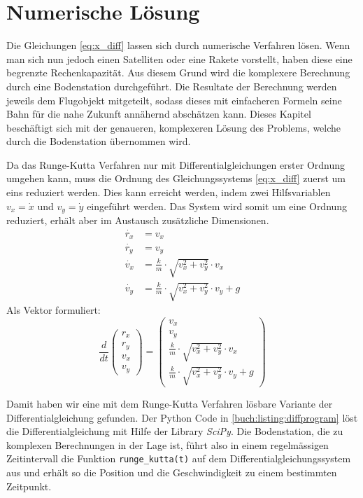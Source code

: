\section{Numerische Lösung
\label{perturbation:section:nummerischeloesung}}
Die Gleichungen \eqref{eq:x_diff} lassen sich durch numerische Verfahren lösen.
Wenn man sich nun jedoch einen Satelliten oder eine Rakete vorstellt, haben diese eine begrenzte Rechenkapazität.
Aus diesem Grund wird die komplexere Berechnung durch eine Bodenstation durchgeführt.
Die Resultate der Berechnung werden jeweils dem Flugobjekt mitgeteilt, sodass dieses mit einfacheren Formeln seine Bahn für die nahe Zukunft annähernd abschätzen kann.
Dieses Kapitel beschäftigt sich mit der genaueren, komplexeren Lösung des Problems, welche durch die Bodenstation übernommen wird.

Da das Runge-Kutta Verfahren nur mit Differentialgleichungen erster Ordnung umgehen kann, muss die Ordnung des Gleichungssystems \eqref{eq:x_diff}  zuerst um eins reduziert werden.
Dies kann erreicht werden, indem zwei Hilfsvariablen $v_x = \dot{x}$ und $v_y = \dot{y}$ eingeführt werden.
Das System wird somit um eine Ordnung reduziert, erhält aber im Austausch zusätzliche Dimensionen.
\begin{equation*}
\begin{aligned}
	\dot{r_x} &= v_x  \\
	\dot{r_y} &= v_y \\
	\dot{v_x} &= \frac{k}{m} \cdot \sqrt{v_x^2 + v_y^2} \cdot v_x \\
	\dot{v_y} &= \frac{k}{m} \cdot \sqrt{v_x^2 + v_y^2} \cdot v_y + g
\end{aligned}
\end{equation*}
Als Vektor formuliert:
\[
\frac{d}{dt}\begin{pmatrix}r_x\\r_y\\v_x\\v_y\end{pmatrix} = \begin{pmatrix}v_x\\v_y\\\frac{k}{m} \cdot \sqrt{v_x^2 + v_y^2} \cdot v_x\\\frac{k}{m} \cdot \sqrt{v_x^2 + v_y^2} \cdot v_y + g\end{pmatrix}
\]

Damit haben wir eine mit dem  Runge-Kutta Verfahren lösbare Variante der Differentialgleichung gefunden.
Der Python Code in \ref{buch:listing:diffprogram} löst die Differentialgleichung mit Hilfe der Library \textit{SciPy}.
Die Bodenstation, die zu komplexen Berechnungen in der Lage ist,
führt also in einem regelmässigen Zeitintervall die Funktion \lstinline[language=Python]{runge_kutta(t)}
auf dem Differentialgleichungssystem aus und erhält so die Position und die Geschwindigkeit zu einem bestimmten Zeitpunkt.




